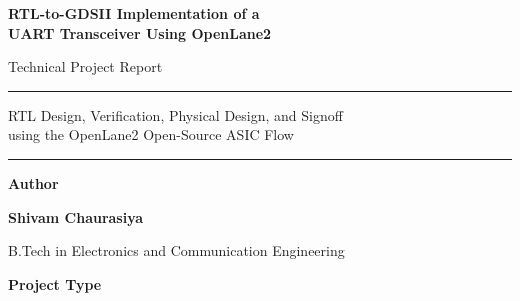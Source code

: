 \begin{titlepage}
\thispagestyle{empty}

\begin{center}

\vspace*{0.8cm}


{\Huge\bfseries\color{TitleBlue}
RTL-to-GDSII Implementation of a\\[0.25cm]
UART Transceiver
Using OpenLane2
}

\vspace{0.65cm}

{\Large\color{black!80}
Technical Project Report
}

\vspace{0.45cm}

{\color{RuleBlue}\rule{0.88\textwidth}{0.8pt}}

\vspace{0.40cm}

{\large
RTL Design, Verification, Physical Design, and Signoff\\
using the OpenLane2 Open-Source ASIC Flow
}

\vspace{0.40cm}

{\color{RuleBlue}\rule{0.88\textwidth}{0.8pt}}

\vspace{0.90cm}


{\Large\bfseries\color{SectionBlue}
Author
}

\vspace{0.20cm}

{\Huge\bfseries
Shivam Chaurasiya
}

\vspace{0.15cm}

{\large
B.Tech in Electronics and Communication Engineering
}

\vspace{0.70cm}


{\Large\bfseries\color{SectionBlue}
Project Type
}


\end{center}
\end{titlepage}
